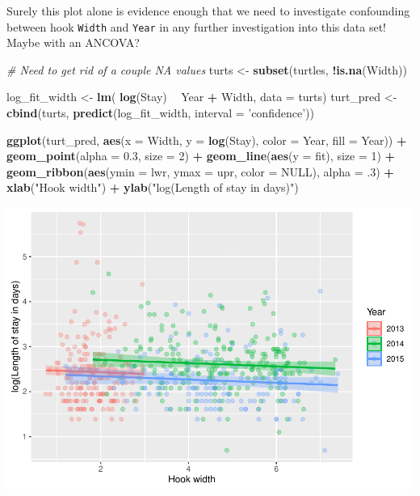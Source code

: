 \documentclass[
]{book}
\newenvironment{Shaded}{\begin{snugshade}}{\end{snugshade}}
\newcommand{\CommentTok}[1]{\textcolor[rgb]{0.56,0.35,0.01}{\textit{#1}}}
\newcommand{\DataTypeTok}[1]{\textcolor[rgb]{0.13,0.29,0.53}{#1}}
\newcommand{\DecValTok}[1]{\textcolor[rgb]{0.00,0.00,0.81}{#1}}
\newcommand{\FloatTok}[1]{\textcolor[rgb]{0.00,0.00,0.81}{#1}}
\newcommand{\KeywordTok}[1]{\textcolor[rgb]{0.13,0.29,0.53}{\textbf{#1}}}
\newcommand{\NormalTok}[1]{#1}
\newcommand{\OperatorTok}[1]{\textcolor[rgb]{0.81,0.36,0.00}{\textbf{#1}}}
\newcommand{\OtherTok}[1]{\textcolor[rgb]{0.56,0.35,0.01}{#1}}
\newcommand{\StringTok}[1]{\textcolor[rgb]{0.31,0.60,0.02}{#1}}
\begin{document}
Surely this plot alone is evidence enough that we need to investigate confounding between hook \texttt{Width} and \texttt{Year} in any further investigation into this data set! Maybe with an ANCOVA?

\begin{Shaded}
\begin{Highlighting}[]
\CommentTok{# Need to get rid of a couple NA values}
\NormalTok{turts <-}\StringTok{ }\KeywordTok{subset}\NormalTok{(turtles, }\OperatorTok{!}\KeywordTok{is.na}\NormalTok{(Width))}

\NormalTok{log_fit_width <-}\StringTok{ }\KeywordTok{lm}\NormalTok{( }\KeywordTok{log}\NormalTok{(Stay) }\OperatorTok{~}\StringTok{ }\NormalTok{Year }\OperatorTok{+}\StringTok{ }\NormalTok{Width, }\DataTypeTok{data =}\NormalTok{ turts)}
\NormalTok{turt_pred <-}\StringTok{ }\KeywordTok{cbind}\NormalTok{(turts, }\KeywordTok{predict}\NormalTok{(log_fit_width, }\DataTypeTok{interval =} \StringTok{'confidence'}\NormalTok{))}

\KeywordTok{ggplot}\NormalTok{(turt_pred, }
       \KeywordTok{aes}\NormalTok{(}\DataTypeTok{x =}\NormalTok{ Width, }\DataTypeTok{y =} \KeywordTok{log}\NormalTok{(Stay), }\DataTypeTok{color =}\NormalTok{ Year, }\DataTypeTok{fill =}\NormalTok{ Year)) }\OperatorTok{+}
\StringTok{  }\KeywordTok{geom_point}\NormalTok{(}\DataTypeTok{alpha =} \FloatTok{0.3}\NormalTok{, }\DataTypeTok{size =} \DecValTok{2}\NormalTok{) }\OperatorTok{+}
\StringTok{  }\KeywordTok{geom_line}\NormalTok{(}\KeywordTok{aes}\NormalTok{(}\DataTypeTok{y =}\NormalTok{ fit), }\DataTypeTok{size =} \DecValTok{1}\NormalTok{) }\OperatorTok{+}
\StringTok{  }\KeywordTok{geom_ribbon}\NormalTok{(}\KeywordTok{aes}\NormalTok{(}\DataTypeTok{ymin =}\NormalTok{ lwr, }\DataTypeTok{ymax =}\NormalTok{ upr, }\DataTypeTok{color =} \OtherTok{NULL}\NormalTok{), }\DataTypeTok{alpha =} \FloatTok{.3}\NormalTok{) }\OperatorTok{+}
\StringTok{  }\KeywordTok{xlab}\NormalTok{(}\StringTok{"Hook width"}\NormalTok{) }\OperatorTok{+}
\StringTok{  }\KeywordTok{ylab}\NormalTok{(}\StringTok{"log(Length of stay in days)"}\NormalTok{)}
\end{Highlighting}
\end{Shaded}

\includegraphics{worstr_files/figure-latex/unnamed-chunk-242-1.pdf}
\end{document}
